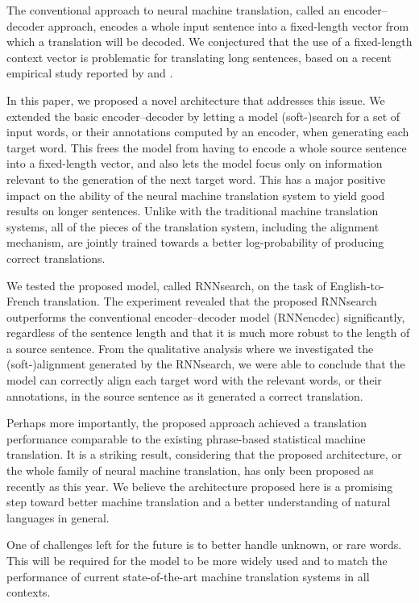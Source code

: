 The conventional approach to neural machine translation, called an
encoder--decoder approach, encodes a whole input sentence into a fixed-length
vector from which a translation will be decoded. We conjectured that the use of
a fixed-length context vector is problematic for translating long sentences,
based on a recent empirical study reported by \citet{Cho2014a} and
\citet{Pouget2014}.

In this paper, we proposed a novel architecture that addresses this issue. We
extended the basic encoder--decoder by letting a model \mbox{(soft-)search} for
a set of input words, or their annotations computed by an encoder, when
generating each target word. This frees the model from having to encode a whole
source sentence into a fixed-length vector, and also lets the model focus only
on information relevant to the generation of the next target word. This has a
major positive impact on the ability of the neural machine translation system to
yield good results on longer sentences. Unlike with the traditional machine
translation systems, all of the pieces of the translation system, including the
alignment mechanism, are jointly trained towards a better log-probability of
producing correct translations.

We tested the proposed model, called RNNsearch, on the task of English-to-French
translation. The experiment revealed that the proposed RNNsearch outperforms the
conventional encoder--decoder model (RNNencdec) significantly, regardless of the
sentence length and that it is much more robust to the length of a source
sentence. From the qualitative analysis where we investigated the
\mbox{(soft-)alignment} generated by the RNNsearch, we were able to conclude
that the model can correctly align each target word with the relevant words, or
their annotations, in the source sentence as it generated a correct translation.

Perhaps more importantly, the proposed approach achieved a translation
performance comparable to the existing phrase-based statistical machine
translation. It is a striking result, considering that the proposed
architecture, or the whole family of neural machine translation, has only been
proposed as recently as this year. We believe the architecture proposed here is
a promising step toward better machine translation and a better understanding of
natural languages in general.

One of challenges left for the future is to better handle unknown, or rare
words. This will be required for the model to be more widely used and to match
the performance of current state-of-the-art machine translation systems in all
contexts.

